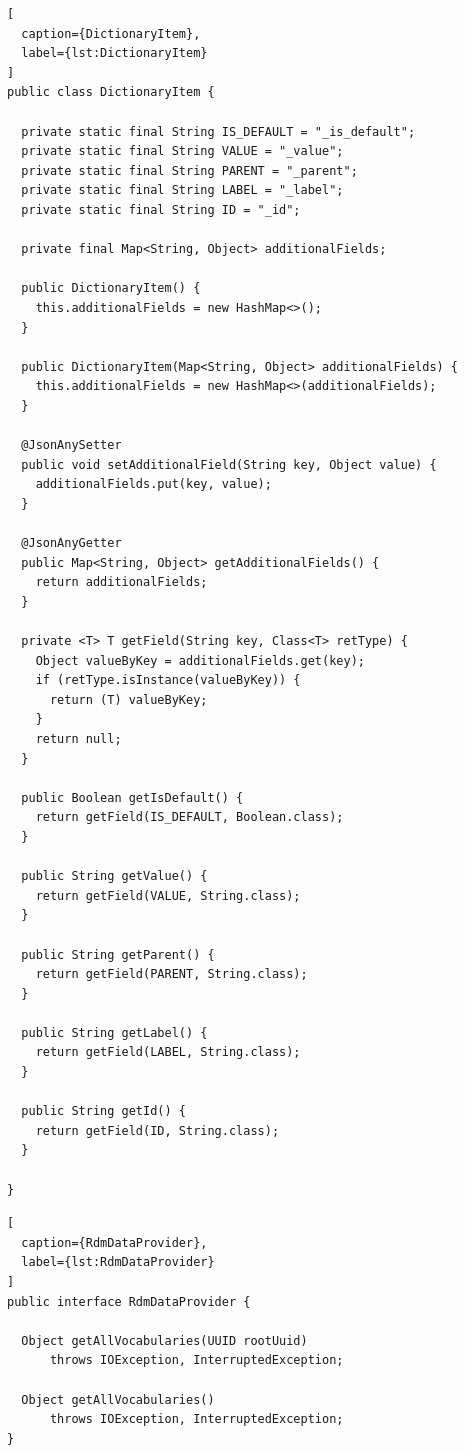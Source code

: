 \begin{lstlisting}[
  caption={DictionaryItem},
  label={lst:DictionaryItem}
]
public class DictionaryItem {

  private static final String IS_DEFAULT = "_is_default";
  private static final String VALUE = "_value";
  private static final String PARENT = "_parent";
  private static final String LABEL = "_label";
  private static final String ID = "_id";

  private final Map<String, Object> additionalFields;

  public DictionaryItem() {
    this.additionalFields = new HashMap<>();
  }
  
  public DictionaryItem(Map<String, Object> additionalFields) {
    this.additionalFields = new HashMap<>(additionalFields);
  }

  @JsonAnySetter
  public void setAdditionalField(String key, Object value) {
    additionalFields.put(key, value);
  }

  @JsonAnyGetter
  public Map<String, Object> getAdditionalFields() {
    return additionalFields;
  }

  private <T> T getField(String key, Class<T> retType) {
    Object valueByKey = additionalFields.get(key);
    if (retType.isInstance(valueByKey)) {
      return (T) valueByKey;
    }
    return null;
  }

  public Boolean getIsDefault() {
    return getField(IS_DEFAULT, Boolean.class);
  }

  public String getValue() {
    return getField(VALUE, String.class);
  }

  public String getParent() {
    return getField(PARENT, String.class);
  }
  
  public String getLabel() {
    return getField(LABEL, String.class);
  }

  public String getId() {
    return getField(ID, String.class);
  }

}
\end{lstlisting}

\begin{lstlisting}[
  caption={RdmDataProvider},
  label={lst:RdmDataProvider}
]
public interface RdmDataProvider {

  Object getAllVocabularies(UUID rootUuid)
      throws IOException, InterruptedException;
      
  Object getAllVocabularies()
      throws IOException, InterruptedException;
}
\end{lstlisting}

